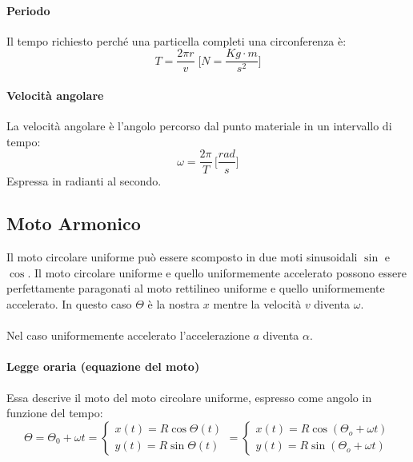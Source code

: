         \paragraph{Periodo} Il tempo richiesto perché una particella completi
        una circonferenza è:
        \begin{equation}
            T = \frac{2\pi r}{v} \; \Bigg[N = \frac{Kg \cdot m}{s^2} \Bigg]
        \end{equation}

        \paragraph{Velocità angolare} La velocità angolare è l'angolo percorso
        dal punto materiale in un intervallo di tempo:
        \begin{equation}
            \omega = \frac{2\pi}{T} \, \Bigg[\frac{rad}{s} \Bigg]
        \end{equation}
        Espressa in radianti al secondo.

    
        \subsection{Moto Armonico}  \label{moto_armonico}
        Il moto circolare uniforme può essere scomposto in due moti sinusoidali 
        $\sin$ e $\cos$.
        Il moto circolare uniforme e quello uniformemente accelerato possono 
        essere perfettamente paragonati al moto rettilineo uniforme e quello 
        uniformemente accelerato. In questo caso $\Theta$ è la nostra $x$ 
        mentre la velocità $v$ diventa $\omega$.\\\\
        Nel caso uniformemente accelerato l'accelerazione $a$ diventa $\alpha$.

        \paragraph{Legge oraria (equazione del moto)} Essa descrive il moto del
        moto circolare uniforme, espresso come angolo in funzione del tempo:
        \begin{equation}
            \Theta = \Theta_0 + \omega t = 
            \begin{cases}
                x(t)=R\cos{\Theta(t)} \\
                y(t)=R\sin{\Theta(t)}
            \end{cases} 
            = 
            \begin{cases}
                x(t)=R\cos{(\Theta_o+\omega t)} \\
                y(t)=R\sin{(\Theta_o+\omega t)}
            \end{cases}
        \end{equation}


